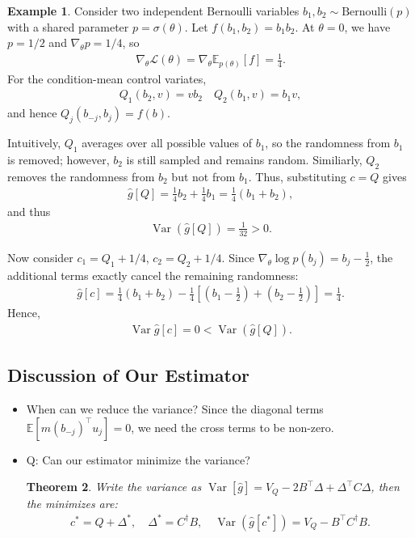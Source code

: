 \documentclass{article}
\theoremstyle{plain}
\newtheorem{theorem}{Theorem}
\theoremstyle{definition}
\newtheorem{example}[theorem]{Example}
\newcommand{\E}{\mathbb{E}}
\DeclareMathOperator{\Var}{Var}
\newcommand{\gL}{\mathcal{L}}
\begin{document}
\begin{example}
    Consider two independent Bernoulli variables $b_1, b_2 \sim \mathrm{Bernoulli}(p)$ with a shared parameter $p = \sigma(\theta)$. Let $f(b_1, b_2) = b_1b_2$. At $\theta = 0$, we have $p=1/2$ and $\nabla_\theta p = 1/4$, so 
    \begin{align}
        \nabla_\theta \gL(\theta) =  \nabla_\theta \E_{p(\theta)}[f]=\frac14.
    \end{align}
    For the condition-mean control variates,
    \begin{align}
        Q_1 (b_2, v) = vb_2 \quad Q_2 (b_1, v) = b_1 v,
    \end{align}
    and hence $Q_j(b_{-j},b_j)=f(b)$.

    Intuitively, $Q_1$ averages over all possible values of $b_1$, so the randomness from $b_1$ is removed; however, $b_2$ is still sampled and remains random. Similiarly, $Q_2$ removes the randomness from $b_2$ but not from $b_1$. Thus, substituting $c=Q$ gives 
    \begin{align}
        \hat g[Q] = \frac{1}{4} b_2 + \frac{1}{4}b_1 = \frac{1}{4} (b_1 + b_2),
    \end{align}
    and thus
    \begin{align}
        \Var(\hat{g}[Q]) = \frac{1}{32} > 0.
    \end{align}

    Now consider $c_1 = Q_1 + 1/4$, $c_2 = Q_2 + 1/4$. Since 
    $\nabla_\theta \log p(b_j)=b_j-\frac12$, the additional terms exactly cancel the remaining randomness:
    \begin{align}
        \hat g[c]
=
\frac14(b_1+b_2)
-\frac14\left[
\left(b_1-\frac12\right)
+
\left(b_2-\frac12\right)
\right]
=
\frac14.
    \end{align}
    Hence,
    \begin{align}
        \Var \hat g[c] = 0 < \Var(\hat{g}[Q]).
    \end{align}
\end{example}

\subsection{Discussion of Our Estimator}

\begin{itemize}
    \item When can we reduce the variance?
    Since the diagonal terms $\E[m(b_{-j})^\top u_j] = 0$, we need the cross terms to be non-zero.
    \item Q: Can our estimator minimize the variance?

\begin{theorem}
    Write the variance as $\Var[\hat{g}] = V_Q - 2B^\top \Delta + \Delta^\top C\Delta$, then the minimizes are:
    \begin{align}
        c^* = Q + \Delta^*, \quad \Delta^* = C^\dagger B, \quad \Var(\hat{g}[c^*]) = V_Q - B^\top C^\dagger B.
    \end{align}
\end{theorem}
\end{itemize}
\end{document}
